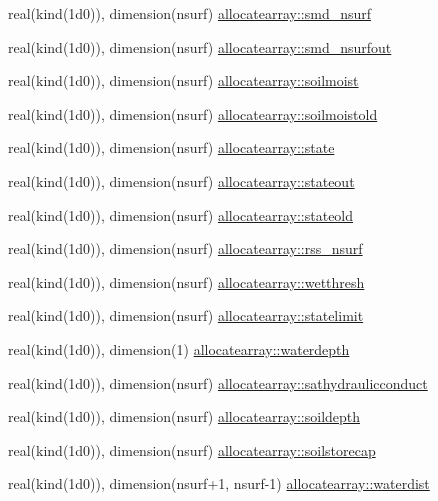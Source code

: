 \begin{DoxyCompactItemize}
\item 
real(kind(1d0)), dimension(nsurf) \hyperlink{namespaceallocatearray_a1dcc99b13956867bdc2a58c234193a2e}{allocatearray\+::smd\+\_\+nsurf}
\item 
real(kind(1d0)), dimension(nsurf) \hyperlink{namespaceallocatearray_a332b5e58530f77936db6b394822768c9}{allocatearray\+::smd\+\_\+nsurfout}
\item 
real(kind(1d0)), dimension(nsurf) \hyperlink{namespaceallocatearray_ae688a4f5497c961baf9c8eecae674ec4}{allocatearray\+::soilmoist}
\item 
real(kind(1d0)), dimension(nsurf) \hyperlink{namespaceallocatearray_a21359b000cf1cea64f86412e4336b957}{allocatearray\+::soilmoistold}
\item 
real(kind(1d0)), dimension(nsurf) \hyperlink{namespaceallocatearray_a1573a7ac84781a2f33ba27e9b4fd7fc4}{allocatearray\+::state}
\item 
real(kind(1d0)), dimension(nsurf) \hyperlink{namespaceallocatearray_ac4a521fdb896dece1a1412de6892e77c}{allocatearray\+::stateout}
\item 
real(kind(1d0)), dimension(nsurf) \hyperlink{namespaceallocatearray_a417b9ff3eb6479963b494b8c50d661c2}{allocatearray\+::stateold}
\item 
real(kind(1d0)), dimension(nsurf) \hyperlink{namespaceallocatearray_ac0727c70a30d09ad8597e7b6456b619f}{allocatearray\+::rss\+\_\+nsurf}
\item 
real(kind(1d0)), dimension(nsurf) \hyperlink{namespaceallocatearray_ade77725040669c18c67ee2a4891b2711}{allocatearray\+::wetthresh}
\item 
real(kind(1d0)), dimension(nsurf) \hyperlink{namespaceallocatearray_a66a859de2b0cea378b18814cdb0438ba}{allocatearray\+::statelimit}
\item 
real(kind(1d0)), dimension(1) \hyperlink{namespaceallocatearray_a1b3be466e275395a0ce613feb29c678d}{allocatearray\+::waterdepth}
\item 
real(kind(1d0)), dimension(nsurf) \hyperlink{namespaceallocatearray_a7a8427e580d0969440e13673f28c5104}{allocatearray\+::sathydraulicconduct}
\item 
real(kind(1d0)), dimension(nsurf) \hyperlink{namespaceallocatearray_a243033c7c16c825a30417c6bd4ea9f4e}{allocatearray\+::soildepth}
\item 
real(kind(1d0)), dimension(nsurf) \hyperlink{namespaceallocatearray_a1c0a391fbf8e63a46d93cae2c6c11049}{allocatearray\+::soilstorecap}
\item 
real(kind(1d0)), dimension(nsurf+1, nsurf-\/1) \hyperlink{namespaceallocatearray_a7d0c9b91506a6be29f8c45bbb9a0411c}{allocatearray\+::waterdist}

\end{DoxyCompactItemize}

